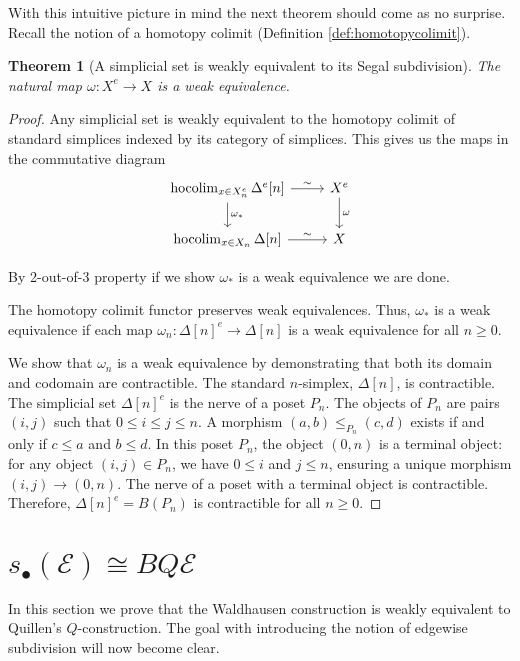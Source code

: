 \documentclass[12pt]{report}
\numberwithin{equation}{section}
\DeclareMathOperator*{\hocolim}{hoco{\lim}}
\newtheorem{theorem}[dummy]{Theorem}
\begin{document}
	With this intuitive picture in mind the next theorem should come as no surprise. Recall the notion of a homotopy colimit (Definition \ref{def:homotopycolimit}).
	\begin{theorem}[A simplicial set is weakly equivalent to its Segal subdivision] \label{th:segalsubdivweakeq}
		The natural map \( \omega:X^e \to X \) is a weak equivalence.
	\end{theorem}
	\begin{proof}
		Any simplicial set is weakly equivalent to the homotopy colimit of standard simplices indexed by its category of simplices.
		This gives us the maps in the commutative diagram
		\[
		\begin{tikzcd}
			\hocolim_{x\in X^e_n} \Delta^e[n] \arrow{r}{\sim} \arrow{d}{\omega_*} & X^e \arrow{d}{\omega} \\
			\hocolim_{x \in X_n} \Delta[n] \arrow{r}{\sim} & X
		\end{tikzcd}
		\]
		
		By 2-out-of-3 property if we show \( \omega_* \) is a weak equivalence we are done. 
		
		The homotopy colimit functor preserves weak equivalences. Thus, \( \omega_* \) is a weak equivalence if each map \( \omega_n: \Delta[n]^e \to \Delta[n] \) is a weak equivalence for all \( n \ge 0 \).
		
		We show that \( \omega_n \) is a weak equivalence by demonstrating that both its domain and codomain are contractible.
		The standard \(n\)-simplex, \( \Delta[n] \), is contractible.
		The simplicial set \( \Delta[n]^e \) is the nerve of a poset \( P_n \). The objects of \( P_n \) are pairs \( (i,j) \) such that \( 0 \le i \le j \le n \). A morphism \( (a,b) \le_{P_n} (c,d) \) exists if and only if \( c \le a \) and \( b \le d \).
		In this poset \( P_n \), the object \( (0,n) \) is a terminal object: for any object \( (i,j) \in P_n \), we have \( 0 \le i \) and \( j \le n \), ensuring a unique morphism \( (i,j) \to (0,n) \). The nerve of a poset with a terminal object is contractible. Therefore, \( \Delta[n]^e = B(P_n) \) is contractible for all \( n \ge 0 \).
	\end{proof}
	
	\section{\( s_\bullet(\mathcal{E}) \cong BQ \mathcal{E} \)}
	In this section we prove that the Waldhausen construction is weakly equivalent to Quillen's \( Q \)-construction. The goal with introducing the notion of edgewise subdivision will now become clear.
	
\end{document}
